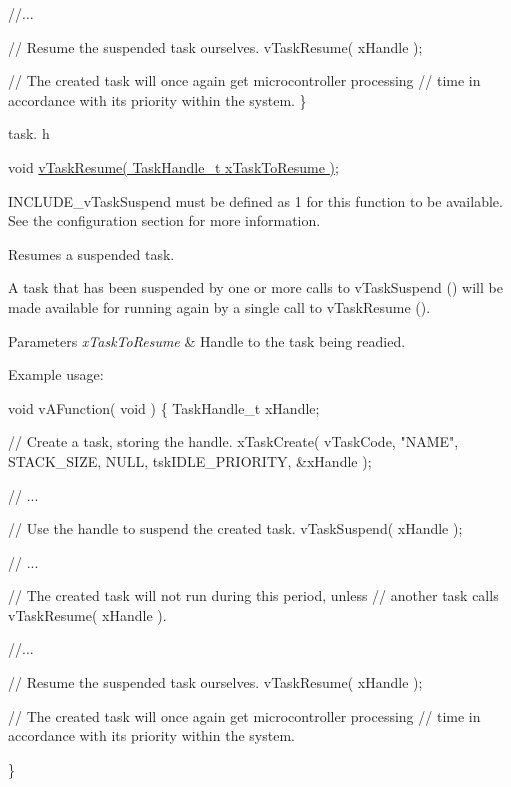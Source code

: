 \begin{DoxyPre}  //...\end{DoxyPre}



\begin{DoxyPre}  // Resume the suspended task ourselves.
  vTaskResume( xHandle );\end{DoxyPre}



\begin{DoxyPre}  // The created task will once again get microcontroller processing
  // time in accordance with its priority within the system.
\}
\end{DoxyPre}


task. h 
\begin{DoxyPre}void \hyperlink{externals_2freertos_2include_2task_8h_a84a1584f29fb7736a1aa72ad5b3e9b44}{vTaskResume( TaskHandle\_t xTaskToResume )};\end{DoxyPre}


I\+N\+C\+L\+U\+D\+E\+\_\+v\+Task\+Suspend must be defined as 1 for this function to be available. See the configuration section for more information.

Resumes a suspended task.

A task that has been suspended by one or more calls to v\+Task\+Suspend () will be made available for running again by a single call to v\+Task\+Resume ().


\begin{DoxyParams}{Parameters}
{\em x\+Task\+To\+Resume} & Handle to the task being readied.\\
\hline
\end{DoxyParams}
Example usage\+: 
\begin{DoxyPre}
void vAFunction( void )
\{
TaskHandle\_t xHandle;
\begin{DoxyVerb}// Create a task, storing the handle.
xTaskCreate( vTaskCode, "NAME", STACK_SIZE, NULL, tskIDLE_PRIORITY, &xHandle );

// ...

// Use the handle to suspend the created task.
vTaskSuspend( xHandle );

// ...

// The created task will not run during this period, unless
// another task calls vTaskResume( xHandle ).

//...


// Resume the suspended task ourselves.
vTaskResume( xHandle );

// The created task will once again get microcontroller processing
// time in accordance with its priority within the system.
\end{DoxyVerb}

\}
  \end{DoxyPre}
 